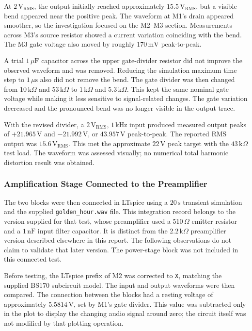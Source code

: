 \documentclass[conference]{IEEEtran}
\begin{document}
At $2\,\mathrm{V_{RMS}}$, the output initially reached approximately $15.5\,\mathrm{V_{RMS}}$, but a visible bend appeared near the positive peak. The waveform at M1's drain appeared smoother, so the investigation focused on the M2--M3 section. Measurements across M3's source resistor showed a current variation coinciding with the bend. The M3 gate voltage also moved by roughly $170\,\mathrm{mV}$ peak-to-peak.

A trial $1\,\mu\mathrm{F}$ capacitor across the upper gate-divider resistor did not improve the observed waveform and was removed. Reducing the simulation maximum time step to $1\,\mu\mathrm{s}$ also did not remove the bend. The gate divider was then changed from $10\,\mathrm{k}\Omega$ and $53\,\mathrm{k}\Omega$ to $1\,\mathrm{k}\Omega$ and $5.3\,\mathrm{k}\Omega$. This kept the same nominal gate voltage while making it less sensitive to signal-related changes. The gate variation decreased and the pronounced bend was no longer visible in the output trace.

With the revised divider, a $2\,\mathrm{V_{RMS}}$, $1\,\mathrm{kHz}$ input produced measured output peaks of $+21.965\,\mathrm{V}$ and $-21.992\,\mathrm{V}$, or $43.957\,\mathrm{V}$ peak-to-peak. The reported RMS output was $15.6\,\mathrm{V_{RMS}}$. This met the approximate $22\,\mathrm{V}$ peak target with the $43\,\mathrm{k}\Omega$ test load. The waveform was assessed visually; no numerical total harmonic distortion result was obtained.

\subsubsection{Amplification Stage Connected to the Preamplifier}
The two blocks were then connected in LTspice using a $20\,\mathrm{s}$ transient simulation and the supplied \texttt{golden\_hour.wav} file. This integration record belongs to the version supplied for that test, whose preamplifier used a $510\,\Omega$ emitter resistor and a $1\,\mathrm{nF}$ input filter capacitor. It is distinct from the $2.2\,\mathrm{k}\Omega$ preamplifier version described elsewhere in this report. The following observations do not claim to validate that later version. The power-stage block was not included in this connected test.

Before testing, the LTspice prefix of M2 was corrected to \texttt{X}, matching the supplied BS170 subcircuit model. The input and output waveforms were then compared. The connection between the blocks had a resting voltage of approximately $5.5814\,\mathrm{V}$, set by M1's gate divider. This value was subtracted only in the plot to display the changing audio signal around zero; the circuit itself was not modified by that plotting operation.
\end{document}
